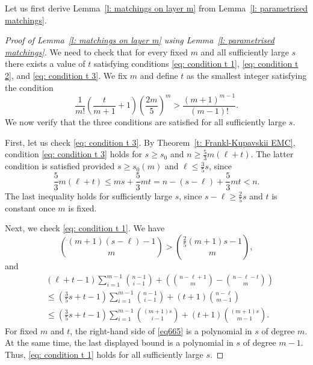 \documentclass{article}
\begin{document}
Let us first derive Lemma~\ref{l: matchings on layer m} from Lemma~\ref{l: parametrised matchings}.

\begin{proof}[Proof of Lemma~\ref{l: matchings on layer m} using Lemma~\ref{l: parametrised matchings}]
We need to check that for every fixed $m$ and all sufficiently large $s$ there exists a value of $t$ satisfying conditions \eqref{eq: condition t 1}, \eqref{eq: condition t 2}, and \eqref{eq: condition t 3}. We fix $m$ and define $t$ as the smallest integer satisfying the condition
\begin{equation} \label{eq: t definition}
\frac{1}{m!}\left(\frac{t}{m+1} + 1\right)\left(\frac{2m}{5}\right)^m >
\frac{(m+1)^{m-1}}{(m-1)!}.
\end{equation}
We now verify that the three conditions are satisfied for all sufficiently large $s$.

First, let us check \eqref{eq: condition t 3}. By Theorem~\ref{t: Frankl-Kupavskii EMC}, condition \eqref{eq: condition t 3} holds for $s \geq s_0$ and
$n \geq \frac{5}{3}m(\ell+t).$
The latter condition is satisfied provided $s \geq s_0(m)$ and $\ell \leq \frac{3}{5}s$, since
\[
\frac{5}{3}m(\ell+t) \leq ms + \frac{5}{3}mt = n - (s-\ell) + \frac{5}{3}mt < n.
\]
The last inequality holds for sufficiently large $s$, since $s-\ell \geq \frac{2}{5}s$ and $t$ is constant once $m$ is fixed.

Next, we check \eqref{eq: condition t 1}. We have
\begin{equation}\label{eq665}
    {(m+1)(s-\ell)-1 \choose m} > {\frac{2}{5}(m+1)s-1 \choose m},
\end{equation}
and
\begin{align*}
    &(\ell+t-1)\sum_{i=1}^{m-1}{n-1 \choose i-1} + \left({n - \ell + 1 \choose m} - {n - \ell - t \choose m}\right) \\
    &\leq \left(\frac{3}{5}s+t-1\right)\sum_{i=1}^{m-1}{n-1 \choose i-1} + (t+1){n - \ell \choose m - 1} \\
    &\leq \left(\frac{3}{5}s+t-1\right)\sum_{i=1}^{m-1}{(m+1)s \choose i-1} + (t+1){(m+1)s \choose m - 1}.
\end{align*}
For fixed $m$ and $t$, the right-hand side of \eqref{eq665} is a polynomial in $s$ of degree $m$. At the same time, the last displayed bound is a polynomial in $s$ of degree $m-1$. Thus, \eqref{eq: condition t 1} holds for all sufficiently large $s$.


\end{proof}
\end{document}
